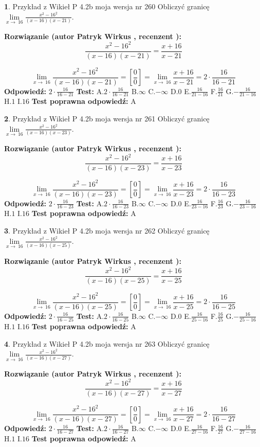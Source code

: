 \documentclass[12pt, a4paper]{article}
\theoremstyle{definition} %
\newtheorem{zad}{}
\newcommand{\zadStart}[1]{\begin{zad}#1\newline}
\newcommand{\zadStop}{\end{zad}}
\newcommand{\rozwStart}[2]{\noindent \textbf{Rozwiązanie (autor #1 , recenzent #2): }\newline}
\newcommand{\rozwStop}{\newline}
\newcommand{\odpStart}{\noindent \textbf{Odpowiedź:}\newline}
\newcommand{\odpStop}{\newline}
\newcommand{\testStart}{\noindent \textbf{Test:}\newline}
\newcommand{\testStop}{\newline}
\newcommand{\kluczStart}{\noindent \textbf{Test poprawna odpowiedź:}\newline}
\newcommand{\kluczStop}{\newline}
\begin{document}
\zadStart{Przykład z Wikieł P 4.2b moja wersja nr 260}
Obliczyć granicę $\lim\limits_{x\to\ 16}\frac{x^{2}-16^{2}}{(x-16)(x-21)}$.
\zadStop
\rozwStart{Patryk Wirkus}{}
$$\frac{x^{2}-16^{2}}{(x-16)(x-21)}=\frac{x+16}{x-21}$$

$$\lim\limits_{x\to\ 16}\frac{x^{2}-16^{2}}{(x-16)(x-21)}=[\frac{0}{0}]=\lim\limits_{x\to\ 16}\frac{x+16}{x-21}=2 \cdot \frac{16}{16-21}$$
\rozwStop
\odpStart
$2 \cdot \frac{16}{16-21}$
\odpStop
\testStart
A.$2 \cdot \frac{16}{16-21}$
B.$\infty$
C.$-\infty$
D.$0$
E.$\frac{16}{21-16}$
F.$\frac{16}{21}$
G.$-\frac{16}{21-16}$
H.$1$
I.$16$
\testStop
\kluczStart
A
\kluczStop



\zadStart{Przykład z Wikieł P 4.2b moja wersja nr 261}
Obliczyć granicę $\lim\limits_{x\to\ 16}\frac{x^{2}-16^{2}}{(x-16)(x-23)}$.
\zadStop
\rozwStart{Patryk Wirkus}{}
$$\frac{x^{2}-16^{2}}{(x-16)(x-23)}=\frac{x+16}{x-23}$$

$$\lim\limits_{x\to\ 16}\frac{x^{2}-16^{2}}{(x-16)(x-23)}=[\frac{0}{0}]=\lim\limits_{x\to\ 16}\frac{x+16}{x-23}=2 \cdot \frac{16}{16-23}$$
\rozwStop
\odpStart
$2 \cdot \frac{16}{16-23}$
\odpStop
\testStart
A.$2 \cdot \frac{16}{16-23}$
B.$\infty$
C.$-\infty$
D.$0$
E.$\frac{16}{23-16}$
F.$\frac{16}{23}$
G.$-\frac{16}{23-16}$
H.$1$
I.$16$
\testStop
\kluczStart
A
\kluczStop



\zadStart{Przykład z Wikieł P 4.2b moja wersja nr 262}
Obliczyć granicę $\lim\limits_{x\to\ 16}\frac{x^{2}-16^{2}}{(x-16)(x-25)}$.
\zadStop
\rozwStart{Patryk Wirkus}{}
$$\frac{x^{2}-16^{2}}{(x-16)(x-25)}=\frac{x+16}{x-25}$$

$$\lim\limits_{x\to\ 16}\frac{x^{2}-16^{2}}{(x-16)(x-25)}=[\frac{0}{0}]=\lim\limits_{x\to\ 16}\frac{x+16}{x-25}=2 \cdot \frac{16}{16-25}$$
\rozwStop
\odpStart
$2 \cdot \frac{16}{16-25}$
\odpStop
\testStart
A.$2 \cdot \frac{16}{16-25}$
B.$\infty$
C.$-\infty$
D.$0$
E.$\frac{16}{25-16}$
F.$\frac{16}{25}$
G.$-\frac{16}{25-16}$
H.$1$
I.$16$
\testStop
\kluczStart
A
\kluczStop



\zadStart{Przykład z Wikieł P 4.2b moja wersja nr 263}
Obliczyć granicę $\lim\limits_{x\to\ 16}\frac{x^{2}-16^{2}}{(x-16)(x-27)}$.
\zadStop
\rozwStart{Patryk Wirkus}{}
$$\frac{x^{2}-16^{2}}{(x-16)(x-27)}=\frac{x+16}{x-27}$$

$$\lim\limits_{x\to\ 16}\frac{x^{2}-16^{2}}{(x-16)(x-27)}=[\frac{0}{0}]=\lim\limits_{x\to\ 16}\frac{x+16}{x-27}=2 \cdot \frac{16}{16-27}$$
\rozwStop
\odpStart
$2 \cdot \frac{16}{16-27}$
\odpStop
\testStart
A.$2 \cdot \frac{16}{16-27}$
B.$\infty$
C.$-\infty$
D.$0$
E.$\frac{16}{27-16}$
F.$\frac{16}{27}$
G.$-\frac{16}{27-16}$
H.$1$
I.$16$
\testStop
\kluczStart
A
\kluczStop
\end{document}

